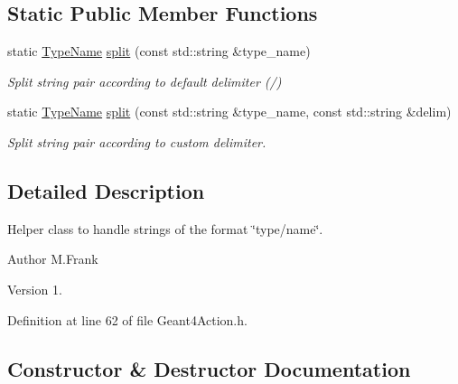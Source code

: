 \subsection*{Static Public Member Functions}
\begin{DoxyCompactItemize}
\item 
static \hyperlink{class_d_d4hep_1_1_simulation_1_1_type_name}{Type\+Name} \hyperlink{class_d_d4hep_1_1_simulation_1_1_type_name_a0f04be3a591eaaa2d36cbd01d3274dd2}{split} (const std\+::string \&type\+\_\+name)
\begin{DoxyCompactList}\small\item\em Split string pair according to default delimiter (\textquotesingle{}/\textquotesingle{}) \end{DoxyCompactList}\item 
static \hyperlink{class_d_d4hep_1_1_simulation_1_1_type_name}{Type\+Name} \hyperlink{class_d_d4hep_1_1_simulation_1_1_type_name_aea4683be81c648ca2e441df288edef48}{split} (const std\+::string \&type\+\_\+name, const std\+::string \&delim)
\begin{DoxyCompactList}\small\item\em Split string pair according to custom delimiter. \end{DoxyCompactList}\end{DoxyCompactItemize}


\subsection{Detailed Description}
Helper class to handle strings of the format \char`\"{}type/name\char`\"{}. 

\begin{DoxyAuthor}{Author}
M.\+Frank 
\end{DoxyAuthor}
\begin{DoxyVersion}{Version}
1. 
\end{DoxyVersion}


Definition at line 62 of file Geant4\+Action.\+h.



\subsection{Constructor \& Destructor Documentation}
\hypertarget{class_d_d4hep_1_1_simulation_1_1_type_name_acd01167ff15a1321cad0d90772911865}{}\label{class_d_d4hep_1_1_simulation_1_1_type_name_acd01167ff15a1321cad0d90772911865} 
